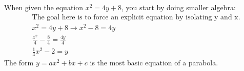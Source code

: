 \documentclass[12pt, letterpaper]{article}
\begin{document}
	When given the equation \(x^2 = 4y + 8\), you start by doing smaller algebra:
	\begin{equation*}
	\begin{split}
		&\text{The goal here is to force an explicit equation by isolating y and x.} \\
		&x^2 = 4y + 8 \longrightarrow x^{2}-8 = 4y \\
		&\frac{x^2}{4} -\frac{8}{4} = \frac{4y}{4} \\
		&\frac{1}{4}x^{2} -2 = y
	\end{split}
	\end{equation*}
	The form \(y = ax^2 + bx + c\) is the most basic equation of a parabola.
	
\end{document}
